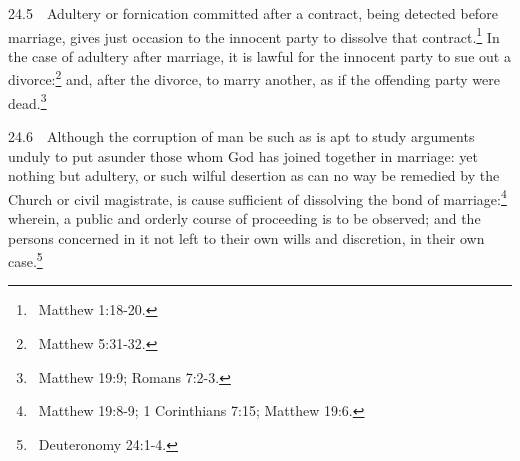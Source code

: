 {{{{{{{{{{{{\bigskip

24.5\ \ Adultery or fornication
committed after a contract, being detected before marriage, gives just occasion to the innocent party to dissolve that contract.\footnote{\ Matthew
1:18-20.} In the case of adultery after marriage, it is lawful for the
innocent party to sue out a divorce:\footnote{\ Matthew 5:31-32.} and, after the divorce, to marry another, as if the offending party were
dead.\footnote{\ Matthew 19:9; Romans 7:2-3.}


\bigskip

24.6\ \ Although the corruption of man be such as is apt to study
arguments unduly to put asunder those whom God has joined
together in marriage: yet nothing but adultery, or such wilful
desertion as can no way be remedied by the Church or
civil magistrate, is cause sufficient of
dissolving the bond of marriage:\footnote{\ Matthew 19:8-9; 1 Corinthians 7:15; Matthew
19:6.} wherein, a public and orderly course of proceeding is to be
observed; and the persons concerned in it not left to their own wills and discretion, in their own case.\footnote{\ Deuteronomy 24:1-4.}

}}}}}}}}}}}}
